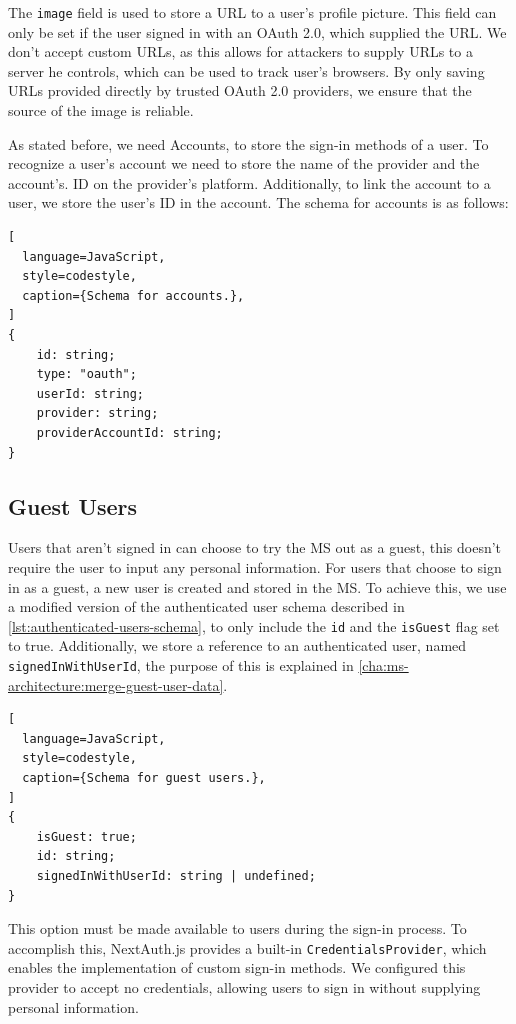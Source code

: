 The \lstinline{image} field is used to store a URL to a user's profile picture. This field
can only be set if the user signed in with an OAuth 2.0, which supplied
the URL.
We don't accept custom URLs, as this allows for attackers to supply URLs to a server he
controls, which can be used to track user's browsers.
By only saving URLs provided directly by trusted OAuth 2.0 providers, we ensure that the
source of the image is reliable.

As stated before, we need Accounts, to store the sign-in methods of a user.
To recognize a user's account we need to store the name of the provider and the account's.
ID on the provider's platform.
Additionally, to link the account to a user, we store the user's ID in the account.
The schema for accounts is as follows:

\begin{lstlisting}[
  language=JavaScript,
  style=codestyle,
  caption={Schema for accounts.},
]
{
    id: string;
    type: "oauth";
    userId: string;
    provider: string;
    providerAccountId: string;
}
\end{lstlisting}

\subsection{Guest Users}

Users that aren't signed in can choose to try the MS out as a guest, this doesn't require
the user to input any personal information.
For users that choose to sign in as a guest, a new user is created and stored in the MS.
To achieve this, we use a modified version of the authenticated user schema described in
\ref{lst:authenticated-users-schema}, to only include the \lstinline{id} and the
\lstinline{isGuest} flag set to true.
Additionally, we store a reference to an authenticated user, named
\lstinline{signedInWithUserId}, the purpose of this is explained in \ref{cha:ms-architecture:merge-guest-user-data}.

\begin{lstlisting}[
  language=JavaScript,
  style=codestyle,
  caption={Schema for guest users.},
]
{
    isGuest: true;
    id: string;
    signedInWithUserId: string | undefined;
} 
\end{lstlisting}

This option must be made available to users during the sign-in process.
To accomplish this, NextAuth.js provides a built-in \lstinline{CredentialsProvider},
which enables the implementation of custom sign-in methods.
We configured this provider to accept no credentials,
allowing users to sign in without supplying personal information.

